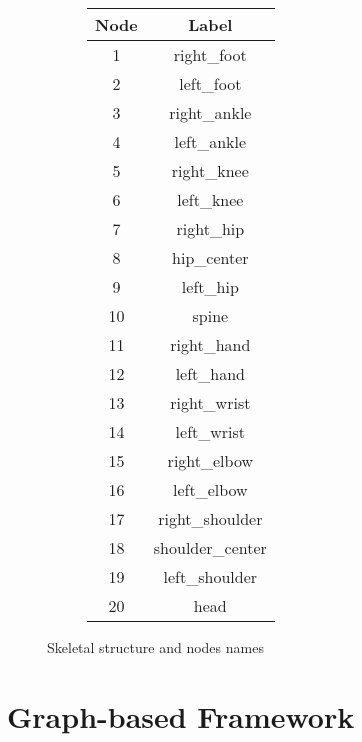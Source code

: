 \begin{figure}[H]
\begin{subfigure}[b]{0.7\linewidth}
  \end{subfigure}
  \label{fig:graph_skeletal}
  \begin{subfigure}[b]{0.29\linewidth}
    \centering
    \begin{table}[H]
      \centering
      \begin{tabular}{||c||c||}
        \hline
        \textbf{Node} & \textbf{Label} \\
        \hline
        1 & right\_foot \\
        2 & left\_foot \\
        3 & right\_ankle \\
        4 & left\_ankle \\
        5 & right\_knee \\
        6 & left\_knee \\
        7 & right\_hip \\
        8 & hip\_center \\
        9 & left\_hip \\
        10 & spine \\
        11 & right\_hand \\
        12 & left\_hand \\
        13 & right\_wrist \\
        14 & left\_wrist \\
        15 & right\_elbow \\
        16 & left\_elbow \\
        17 & right\_shoulder \\
        18 & shoulder\_center \\
        19 & left\_shoulder \\
        20 & head \\
        \hline
      \end{tabular}
    \end{table}
  \end{subfigure}
  \caption{Skeletal structure and nodes names}
  \label{tab:labels_joints}
\end{figure}


\section{Graph-based Framework}
\label{sec:graph_method}


